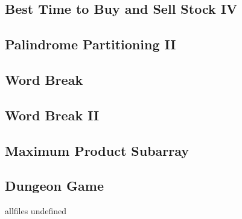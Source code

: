 \documentclass{article}
\begin{document}
\begin{CJK}{UTF8}{gbsn}
\subsection{Best Time to Buy and Sell Stock IV}

\subsection{Palindrome Partitioning II}

\subsection{Word Break}

\subsection{Word Break II}

\subsection{Maximum Product Subarray}

\subsection{Dungeon Game}


\ifx allfiles undefined
\end{CJK}
\end{document}
